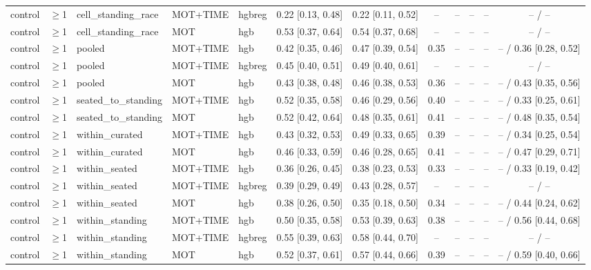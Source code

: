 \begin{longtable}{@{}lllllcccrrrc@{}}
control & $\geq$1 & cell\_standing\_race & MOT+TIME & hgbreg & 0.22 [0.13, 0.48] & 0.22 [0.11, 0.52] & -- & -- & -- & -- & -- / -- \\
control & $\geq$1 & cell\_standing\_race & MOT & hgb & 0.53 [0.37, 0.64] & 0.54 [0.37, 0.68] & -- & -- & -- & -- & -- / -- \\
control & $\geq$1 & pooled & MOT+TIME & hgb & 0.42 [0.35, 0.46] & 0.47 [0.39, 0.54] & 0.35 & -- & -- & -- & -- / 0.36 [0.28, 0.52] \\
control & $\geq$1 & pooled & MOT+TIME & hgbreg & 0.45 [0.40, 0.51] & 0.49 [0.40, 0.61] & -- & -- & -- & -- & -- / -- \\
control & $\geq$1 & pooled & MOT & hgb & 0.43 [0.38, 0.48] & 0.46 [0.38, 0.53] & 0.36 & -- & -- & -- & -- / 0.43 [0.35, 0.56] \\
control & $\geq$1 & seated\_to\_standing & MOT+TIME & hgb & 0.52 [0.35, 0.58] & 0.46 [0.29, 0.56] & 0.40 & -- & -- & -- & -- / 0.33 [0.25, 0.61] \\
control & $\geq$1 & seated\_to\_standing & MOT & hgb & 0.52 [0.42, 0.64] & 0.48 [0.35, 0.61] & 0.41 & -- & -- & -- & -- / 0.48 [0.35, 0.54] \\
control & $\geq$1 & within\_curated & MOT+TIME & hgb & 0.43 [0.32, 0.53] & 0.49 [0.33, 0.65] & 0.39 & -- & -- & -- & -- / 0.34 [0.25, 0.54] \\
control & $\geq$1 & within\_curated & MOT & hgb & 0.46 [0.33, 0.59] & 0.46 [0.28, 0.65] & 0.41 & -- & -- & -- & -- / 0.47 [0.29, 0.71] \\
control & $\geq$1 & within\_seated & MOT+TIME & hgb & 0.36 [0.26, 0.45] & 0.38 [0.23, 0.53] & 0.33 & -- & -- & -- & -- / 0.33 [0.19, 0.42] \\
control & $\geq$1 & within\_seated & MOT+TIME & hgbreg & 0.39 [0.29, 0.49] & 0.43 [0.28, 0.57] & -- & -- & -- & -- & -- / -- \\
control & $\geq$1 & within\_seated & MOT & hgb & 0.38 [0.26, 0.50] & 0.35 [0.18, 0.50] & 0.34 & -- & -- & -- & -- / 0.44 [0.24, 0.62] \\
control & $\geq$1 & within\_standing & MOT+TIME & hgb & 0.50 [0.35, 0.58] & 0.53 [0.39, 0.63] & 0.38 & -- & -- & -- & -- / 0.56 [0.44, 0.68] \\
control & $\geq$1 & within\_standing & MOT+TIME & hgbreg & 0.55 [0.39, 0.63] & 0.58 [0.44, 0.70] & -- & -- & -- & -- & -- / -- \\
control & $\geq$1 & within\_standing & MOT & hgb & 0.52 [0.37, 0.61] & 0.57 [0.44, 0.66] & 0.39 & -- & -- & -- & -- / 0.59 [0.40, 0.66] \\

\end{longtable}
